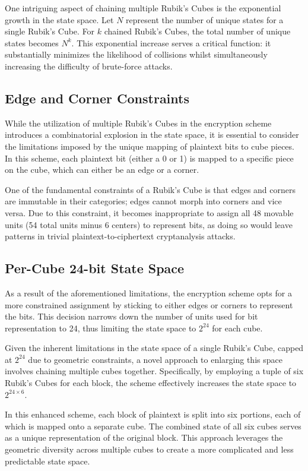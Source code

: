\documentclass[12pt]{article}
\begin{document}
One intriguing aspect of chaining multiple Rubik's Cubes is the exponential growth in the state space. Let \( N \) represent the number of unique states for a single Rubik's Cube. For \( k \) chained Rubik's Cubes, the total number of unique states becomes \( N^k \). This exponential increase serves a critical function: it substantially minimizes the likelihood of collisions whilst simultaneously increasing the difficulty of brute-force attacks.

\subsection{Edge and Corner Constraints}

While the utilization of multiple Rubik's Cubes in the encryption scheme introduces a combinatorial explosion in the state space, it is essential to consider the limitations imposed by the unique mapping of plaintext bits to cube pieces. In this scheme, each plaintext bit (either a 0 or 1) is mapped to a specific piece on the cube, which can either be an edge or a corner.

One of the fundamental constraints of a Rubik's Cube is that edges and corners are immutable in their categories; edges cannot morph into corners and vice versa. Due to this constraint, it becomes inappropriate to assign all 48 movable units (54 total units minus 6 centers) to represent bits, as doing so would leave patterns in trivial plaintext-to-ciphertext cryptanalysis attacks.

\subsection{Per-Cube 24-bit State Space}
As a result of the aforementioned limitations, the encryption scheme opts for a more constrained assignment by sticking to either edges or corners to represent the bits. This decision narrows down the number of units used for bit representation to 24, thus limiting the state space to \(2^{24}\) for each cube.

Given the inherent limitations in the state space of a single Rubik's Cube, capped at \(2^{24}\) due to geometric constraints, a novel approach to enlarging this space involves chaining multiple cubes together. Specifically, by employing a tuple of six Rubik's Cubes for each block, the scheme effectively increases the state space to \(2^{24 \times 6}\).

In this enhanced scheme, each block of plaintext is split into six portions, each of which is mapped onto a separate cube. The combined state of all six cubes serves as a unique representation of the original block. This approach leverages the geometric diversity across multiple cubes to create a more complicated and less predictable state space.
\end{document}
